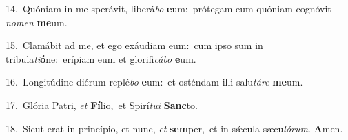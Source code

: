 {\numbfont\textcolor{\numbcolor}{14.}}~Quóniam in me sperávit, liberá\textit{bo} \textbf{e}\-um:~\star prótegam eum quóniam cognóvit \textit{no}\-\textit{men} \textbf{me}\-um.\par
{\numbfont\textcolor{\numbcolor}{15.}}~Clamábit ad me, et ego exáudiam eum:~\dagger cum ipso sum in tribula\-\textit{ti}\-\textbf{ó}ne:~\star erípiam eum et glorifi\-\textit{cá}\-\textit{bo} \textbf{e}\-um.\par
{\numbfont\textcolor{\numbcolor}{16.}}~Longitúdine diérum replé\textit{bo} \textbf{e}\-um:~\star et osténdam illi salu\-\textit{tá}\-\textit{re} \textbf{me}\-um.\par
{\numbfont\textcolor{\numbcolor}{17.}}~Glória Patri, \textit{et} \textbf{Fí}\-lio,~\star et Spirí\-\textit{tu}\-\textit{i} \textbf{Sanc}\-to.\par
{\numbfont\textcolor{\numbcolor}{18.}}~Sicut erat in princípio, et nunc, \textit{et} \textbf{sem}\-per,~\star et in sǽcula sæcu\-\textit{ló}\-\textit{rum}. \textbf{A}\-men.\par
